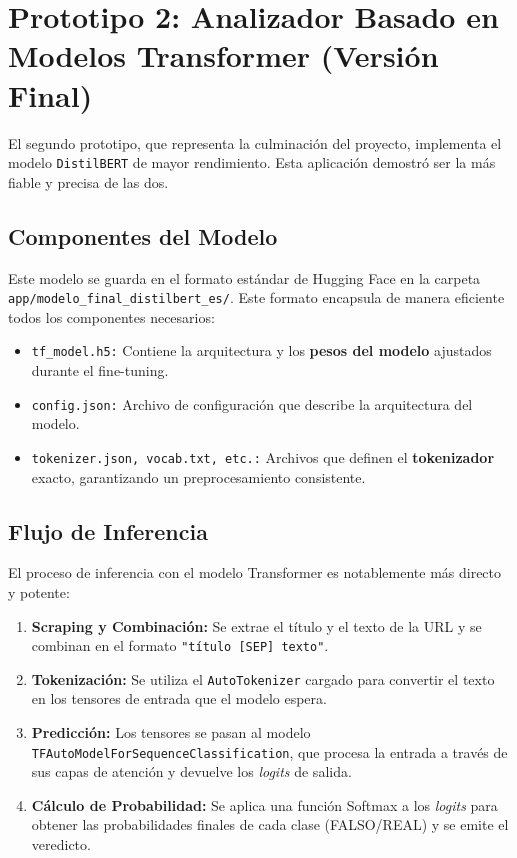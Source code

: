 \section{Prototipo 2: Analizador Basado en Modelos Transformer (Versión Final)}
El segundo prototipo, que representa la culminación del proyecto, implementa el modelo \texttt{DistilBERT} de mayor rendimiento. Esta aplicación demostró ser la más fiable y precisa de las dos.

\subsection{Componentes del Modelo}
Este modelo se guarda en el formato estándar de Hugging Face en la carpeta \texttt{app/modelo\_final\_distilbert\_es/}. Este formato encapsula de manera eficiente todos los componentes necesarios:
\begin{itemize}
    \item \texttt{tf\_model.h5:} Contiene la arquitectura y los \textbf{pesos del modelo} ajustados durante el fine-tuning.
    \item \texttt{config.json:} Archivo de configuración que describe la arquitectura del modelo.
    \item \texttt{tokenizer.json, vocab.txt, etc.:} Archivos que definen el \textbf{tokenizador} exacto, garantizando un preprocesamiento consistente.
\end{itemize}

\subsection{Flujo de Inferencia}
El proceso de inferencia con el modelo Transformer es notablemente más directo y potente:
\begin{enumerate}
    \item \textbf{Scraping y Combinación:} Se extrae el título y el texto de la URL y se combinan en el formato \texttt{"título [SEP] texto"}.
    \item \textbf{Tokenización:} Se utiliza el \texttt{AutoTokenizer} cargado para convertir el texto en los tensores de entrada que el modelo espera.
    \item \textbf{Predicción:} Los tensores se pasan al modelo \texttt{TFAutoModelForSequenceClassification}, que procesa la entrada a través de sus capas de atención y devuelve los \textit{logits} de salida.
    \item \textbf{Cálculo de Probabilidad:} Se aplica una función Softmax a los \textit{logits} para obtener las probabilidades finales de cada clase (FALSO/REAL) y se emite el veredicto.
\end{enumerate}

